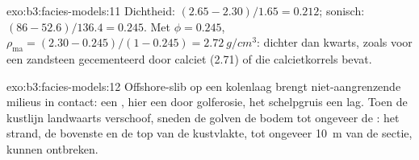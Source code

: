 \begin{solution}{exo:b3:facies-models:11}
Dichtheid: $(2.65 - 2.30)/1.65 = 0.212$; sonisch: $(86 - 52.6)/136.4 = 0.245$.
Met $\phi = 0.245$, $\rho_{\mathrm{ma}} = (2.30 - 0.245)/(1 - 0.245) =
\qty{2.72}{g/cm^3}$: dichter dan kwarts, zoals voor een zandsteen gecementeerd door
calciet (2.71) of die calcietkorrels bevat.
\end{solution}

\begin{solution}{exo:b3:facies-models:12}
Offshore-slib op een kolenlaag brengt niet-aangrenzende milieus in contact: een
, hier een  door golferosie, het schelpgruis
een lag. Toen de kustlijn landwaarts verschoof, sneden de golven de bodem
tot ongeveer de : het strand, de bovenste  en
de top van de kustvlakte, tot ongeveer \qty{10}{m} van de sectie, kunnen
ontbreken.
\end{solution}

